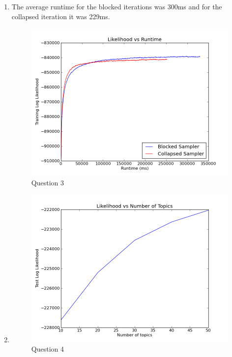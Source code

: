 \documentclass[11pt,a4paper]{article}
\begin{document}
\begin{enumerate}
		\item 	
		The average runtime for the blocked iterations was 300ms and for the
		collapsed iteration it was 229ms.
			\begin{figure}[H]
				\caption{Question 3}
				\begin{center}
					\includegraphics[scale=0.5]{../runtime_plot}
				\end{center}
			\end{figure}
		\item
			\begin{figure}[H]
				\caption{Question 4}
				\begin{center}
					\includegraphics[scale=0.5]{../topics_plot}
				\end{center}

\end{figure}
\end{enumerate}
\end{document}
